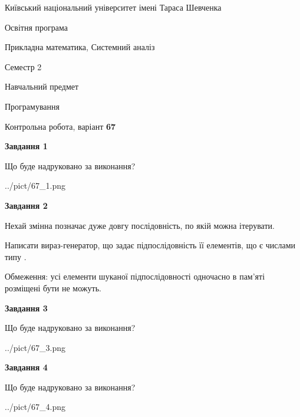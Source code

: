 \documentclass[12pt, ukrainian]{article}
\begin{document}
{{\begin {small}\par
{ \center  Київський національний університет імені Тараса Шевченка \par}
{\parbox {5 cm}{Освітня програма \hfill}{\parbox {8 cm}{Прикладна математика, Системний аналіз \hfill}}\parbox {5 cm}{\hfill Семестр 2}}\par
{\parbox {5 cm} {Навчальний предмет \hfill}\parbox {7 cm}{Програмування \hfill}\parbox {6cm}{\hfill}\par}\vspace{-7pt} \end{small}}{\center Контрольна робота, варіант  \No \textbf
{ 67 }\par}}
{
\begin {large}
{\begin {center}\textbf{Завдання 1}\end {center}}\par
Що буде надруковано за виконання?\par\par
\begin{center}
	{../pict/67_1.png}
\end{center}
\newpage

{\begin {center}\textbf{Завдання 2}\end {center}}\par
Нехай змінна  позначає дуже довгу послідовність, по якій можна ітерувати.

Написати вираз-генератор, що задає підпослідовність її елементів, що є числами типу .

Обмеження: усі елементи шуканої підпослідовності одночасно в пам'яті розміщені бути не можуть.\par
\newpage

{\begin {center}\textbf{Завдання 3}\end {center}}\par
Що буде надруковано за виконання?
\begin{center}
	{../pict/67_3.png}
\end{center}
\newpage

{\begin {center}\textbf{Завдання 4}\end {center}}\par
Що буде надруковано за виконання?\par
\begin{center}
	{../pict/67_4.png}
\end{center}
\newpage


\end{large}}
\end{document}
